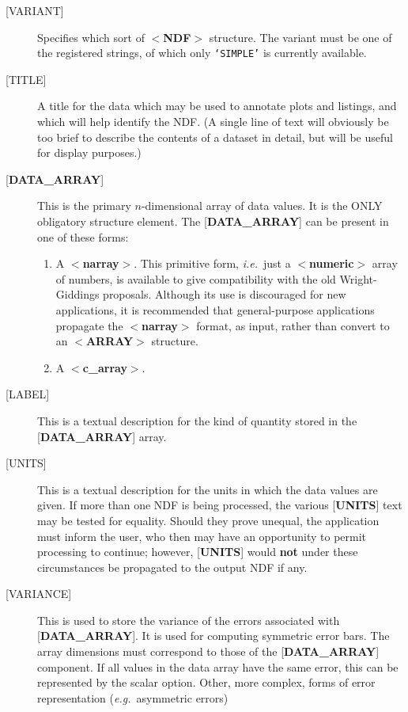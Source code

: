 \documentclass[twoside,11pt,nolof,noabs]{starlink}
\begin{document}
\begin{description}
\item [{[}VARIANT{]}]  Specifies which
sort of $<$\textbf{NDF}$>$ structure.  The variant
must be one
of the registered strings, of which only \texttt{`SIMPLE'} is currently
available.
\item [{[}TITLE{]}]  A title for the data which
may be used to annotate plots and
listings, and which will help identify the NDF.
(A single line of text will obviously be too
brief to describe the contents
of a dataset in detail, but will
be useful for display purposes.)
\item [{[}\textbf{DATA\_ARRAY}{]}]  This is the primary
$n$-dimensional array of data values.
It is the ONLY obligatory structure element.  The
{[}\textbf{DATA\_ARRAY}{]} can be
present in one of these forms:
\begin{enumerate}
\item A $<$\textbf{narray}$>$.
This primitive form, \textit{i.e.}\ just a $<$\textbf{numeric}$>$ array of numbers,
is available to give compatibility with the old Wright-Giddings proposals.
Although its
use is discouraged for new applications, it
is recommended that general-purpose applications
propagate the $<$\textbf{narray}$>$ format, as input,
rather than convert to an
\mbox{$<$\textbf{ARRAY}$>$} structure.
\item A $<$\textbf{c\_array}$>$.
\end{enumerate}
\item [{[}LABEL{]}]  This is a textual description for the kind of quantity
stored in the {[}\textbf{DATA\_ARRAY}{]} array.
\item [{[}UNITS{]}]  This is a textual description for the units in which the
data values are given. If more than one NDF is being processed, the various
{[}\textbf{UNITS}{]} text may be tested for equality.  Should they prove
unequal, the
application must inform the user, who then may have an opportunity to
permit processing to continue;  however, {[}\textbf{UNITS}{]}
would \textbf{not} under these circumstances be
propagated to the output NDF if any.
\item [{[}VARIANCE{]}]  This is used to store the variance of the
errors associated with {[}\textbf{DATA\_ARRAY}{]}.
It is used for computing symmetric error bars.
The array dimensions must correspond to those of the
{[}\textbf{DATA\_ARRAY}{]} component.
If all values in the data array have the same error, this can
be represented by the scalar option.
Other, more complex, forms of error representation
(\textit{e.g.}\  asymmetric errors)

\end{description}
\end{document}
